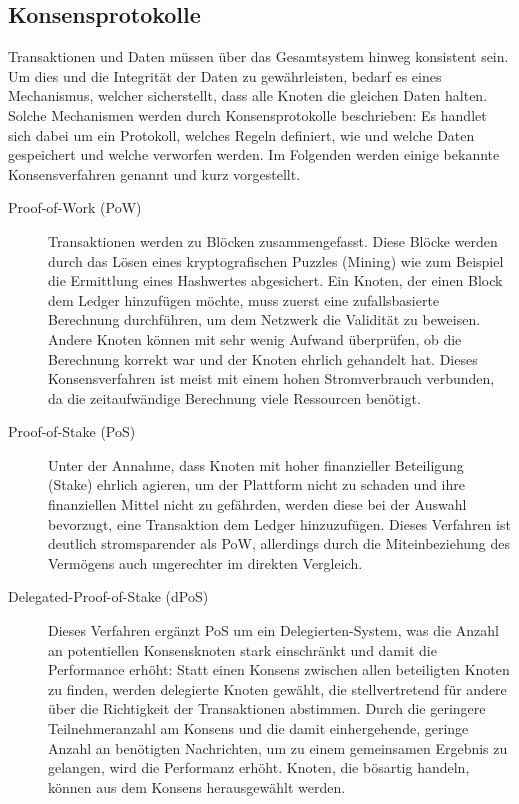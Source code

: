 \subsection{Konsensprotokolle}
\label{subsec:fundamentals:dlt:consensus}
Transaktionen und Daten müssen über das Gesamtsystem hinweg konsistent sein. Um dies und die Integrität der Daten zu gewährleisten, bedarf es eines Mechanismus, welcher sicherstellt, dass alle Knoten die gleichen Daten halten.\\
Solche Mechanismen werden durch Konsensprotokolle beschrieben: Es handlet sich dabei um ein Protokoll, welches Regeln definiert, wie und welche Daten gespeichert und welche verworfen werden. Im Folgenden werden einige bekannte Konsensverfahren genannt und kurz vorgestellt.
\begin{description}
  \item[Proof-of-Work (PoW)] Transaktionen werden zu Blöcken zusammengefasst. Diese Blöcke werden durch das Lösen eines kryptografischen Puzzles (Mining) wie zum Beispiel die Ermittlung eines Hashwertes abgesichert. Ein Knoten, der einen Block dem Ledger hinzufügen möchte, muss zuerst eine zufallsbasierte Berechnung durchführen, um dem Netzwerk die Validität zu beweisen. Andere Knoten können mit sehr wenig Aufwand überprüfen, ob die Berechnung korrekt war und der Knoten ehrlich gehandelt hat. Dieses Konsensverfahren ist meist mit einem hohen Stromverbrauch verbunden, da die zeitaufwändige Berechnung viele Ressourcen benötigt. \cite{Salimitari2018ASO}
  \item[Proof-of-Stake (PoS)] Unter der Annahme, dass Knoten mit hoher finanzieller Beteiligung (Stake) ehrlich agieren, um der Plattform nicht zu schaden und ihre finanziellen Mittel nicht zu gefährden, werden diese bei der Auswahl bevorzugt, eine Transaktion dem Ledger hinzuzufügen. Dieses Verfahren ist deutlich stromsparender als PoW, allerdings durch die Miteinbeziehung des Vermögens auch ungerechter im direkten Vergleich. \cite{Salimitari2018ASO}
  \item[Delegated-Proof-of-Stake (dPoS)] Dieses Verfahren ergänzt PoS um ein Delegierten-System, was die Anzahl an potentiellen Konsensknoten stark einschränkt und damit die Performance erhöht: Statt einen Konsens zwischen allen beteiligten Knoten zu finden, werden delegierte Knoten gewählt, die stellvertretend für andere über die Richtigkeit der Transaktionen abstimmen. Durch die geringere Teilnehmeranzahl am Konsens und die damit einhergehende, geringe Anzahl an benötigten Nachrichten, um zu einem gemeinsamen Ergebnis zu gelangen, wird die Performanz erhöht. Knoten, die bösartig handeln, können aus dem Konsens herausgewählt werden. \cite{Salimitari2018ASO}

\end{description}
